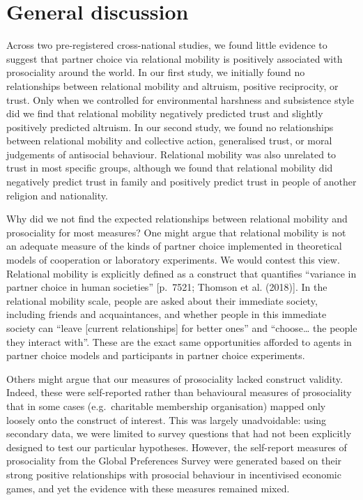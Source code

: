 \documentclass[
  man,floatsintext]{apa6}
\begin{document}
\hypertarget{general-discussion}{%
\section{General discussion}\label{general-discussion}}

Across two pre-registered cross-national studies, we found little evidence to suggest that partner choice via relational mobility is positively associated with prosociality around the world. In our first study, we initially found no relationships between relational mobility and altruism, positive reciprocity, or trust. Only when we controlled for environmental harshness and subsistence style did we find that relational mobility negatively predicted trust and slightly positively predicted altruism. In our second study, we found no relationships between relational mobility and collective action, generalised trust, or moral judgements of antisocial behaviour. Relational mobility was also unrelated to trust in most specific groups, although we found that relational mobility did negatively predict trust in family and positively predict trust in people of another religion and nationality.

Why did we not find the expected relationships between relational mobility and prosociality for most measures? One might argue that relational mobility is not an adequate measure of the kinds of partner choice implemented in theoretical models of cooperation or laboratory experiments. We would contest this view. Relational mobility is explicitly defined as a construct that quantifies ``variance in partner choice in human societies'' {[}p.~7521; Thomson et al. (2018){]}. In the relational mobility scale, people are asked about their immediate society, including friends and acquaintances, and whether people in this immediate society can ``leave {[}current relationships{]} for better ones'' and ``choose\ldots{} the people they interact with''. These are the exact same opportunities afforded to agents in partner choice models and participants in partner choice experiments.

Others might argue that our measures of prosociality lacked construct validity. Indeed, these were self-reported rather than behavioural measures of prosociality that in some cases (e.g.~charitable membership organisation) mapped only loosely onto the construct of interest. This was largely unadvoidable: using secondary data, we were limited to survey questions that had not been explicitly designed to test our particular hypotheses. However, the self-report measures of prosociality from the Global Preferences Survey were generated based on their strong positive relationships with prosocial behaviour in incentivised economic games, and yet the evidence with these measures remained mixed.
\end{document}
